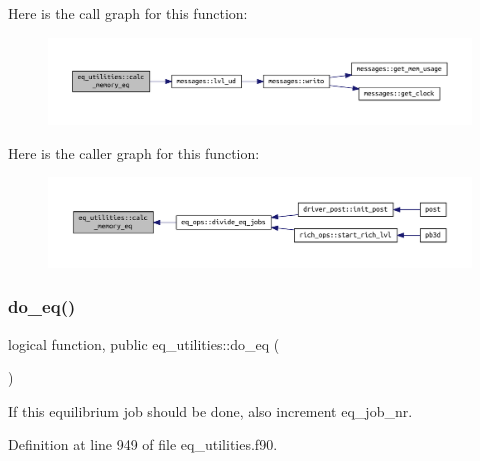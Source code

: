 Here is the call graph for this function\+:\nopagebreak
\begin{figure}[H]
\begin{center}
\leavevmode
\includegraphics[width=350pt]{namespaceeq__utilities_a5a9f230ed9a6e627e31e882e9f4a00a1_cgraph}
\end{center}
\end{figure}
Here is the caller graph for this function\+:\nopagebreak
\begin{figure}[H]
\begin{center}
\leavevmode
\includegraphics[width=350pt]{namespaceeq__utilities_a5a9f230ed9a6e627e31e882e9f4a00a1_icgraph}
\end{center}
\end{figure}
\mbox{\label{namespaceeq__utilities_a5109472305101af3a15e8e8717c426fd}} 
\subsubsection{\texorpdfstring{do\+\_\+eq()}{do\_eq()}}
{\footnotesize\ttfamily logical function, public eq\+\_\+utilities\+::do\+\_\+eq (\begin{DoxyParamCaption}{ }\end{DoxyParamCaption})}



If this equilibrium job should be done, also increment {\ttfamily eq\+\_\+job\+\_\+nr}. 



Definition at line 949 of file eq\+\_\+utilities.\+f90.


